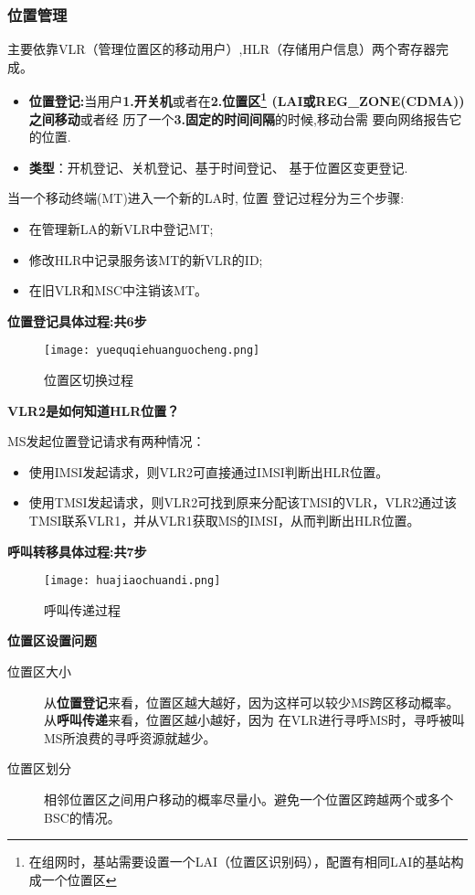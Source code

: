 	\subsubsection{位置管理}
	主要依靠VLR（管理位置区的移动用户）,HLR（存储用户信息）两个寄存器完成。
	\begin{itemize}
		\item \textbf{位置登记:}当用户\textbf{1.开关机}或者在\textbf{2.位置区\footnote{在组网时，基站需要设置一个LAI（位置区识别码），配置有相同LAI的基站构成一个位置区}
		(LAI或REG\_ZONE(CDMA))之间移动}或者经
		历了一个\textbf{3.固定的时间间隔}的时候,移动台需
		要向网络报告它的位置.
		\item \textbf{类型}：开机登记、关机登记、基于时间登记、
		基于位置区变更登记.
	\end{itemize}
	当一个移动终端(MT)进入一个新的LA时, 位置
	登记过程分为三个步骤:
	\begin{itemize}
		\item  在管理新LA的新VLR中登记MT;
		\item  修改HLR中记录服务该MT的新VLR的ID;
		\item 在旧VLR和MSC中注销该MT。
	\end{itemize}
	\textbf{位置登记具体过程:共6步}
	\begin{figure}[H]
		\centering
		\texttt{[image: yuequqiehuanguocheng.png]}
		\caption{位置区切换过程}
	\end{figure}
	\textbf{VLR2是如何知道HLR位置？}
	
	MS发起位置登记请求有两种情况：
	\begin{itemize}
		\item 使用IMSI发起请求，则VLR2可直接通过IMSI判断出HLR位置。
		\item 使用TMSI发起请求，则VLR2可找到原来分配该TMSI的VLR，VLR2通过该TMSI联系VLR1，并从VLR1获取MS的IMSI，从而判断出HLR位置。
	\end{itemize}
	\textbf{呼叫转移具体过程:共7步}
	\begin{figure}[H]
		\centering
		\texttt{[image: huajiaochuandi.png]}
		\caption{呼叫传递过程}
	\end{figure}
	\noindent  \textbf{位置区设置问题}
	\begin{description}
		\item[位置区大小] 从\textbf{位置登记}来看，位置区越大越好，因为这样可以较少MS跨区移动概率。从\textbf{呼叫传递}来看，位置区越小越好，因为
		在VLR进行寻呼MS时，寻呼被叫MS所浪费的寻呼资源就越少。
		\item[位置区划分] 相邻位置区之间用户移动的概率尽量小。避免一个位置区跨越两个或多个BSC的情况。
	\end{description}
	